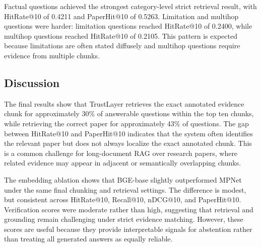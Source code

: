 \documentclass[11pt]{article}
\newcommand{\tablefont}{\footnotesize}
\begin{document}
Factual questions achieved the strongest category-level strict retrieval result, with HitRate@10 of 0.4211 and PaperHit@10 of 0.5263. Limitation and multihop questions were harder: limitation questions reached HitRate@10 of 0.2400, while multihop questions reached HitRate@10 of 0.2105. This pattern is expected because limitations are often stated diffusely and multihop questions require evidence from multiple chunks.

\begin{table}[t]
\centering
\tablefont
\setlength{\tabcolsep}{3pt}
\caption{Category-wise retrieval performance at K=10 for the final BGE-base configuration.}
\label{tab:category}
\end{table}

\subsection{Discussion}

The final results show that TrustLayer retrieves the exact annotated evidence chunk for approximately 30\% of answerable questions within the top ten chunks, while retrieving the correct paper for approximately 43\% of questions. The gap between HitRate@10 and PaperHit@10 indicates that the system often identifies the relevant paper but does not always localize the exact annotated chunk. This is a common challenge for long-document RAG over research papers, where related evidence may appear in adjacent or semantically overlapping chunks.

The embedding ablation shows that BGE-base slightly outperformed MPNet under the same final chunking and retrieval settings. The difference is modest, but consistent across HitRate@10, Recall@10, nDCG@10, and PaperHit@10. Verification scores were moderate rather than high, suggesting that retrieval and grounding remain challenging under strict evidence matching. However, these scores are useful because they provide interpretable signals for abstention rather than treating all generated answers as equally reliable.
\end{document}
